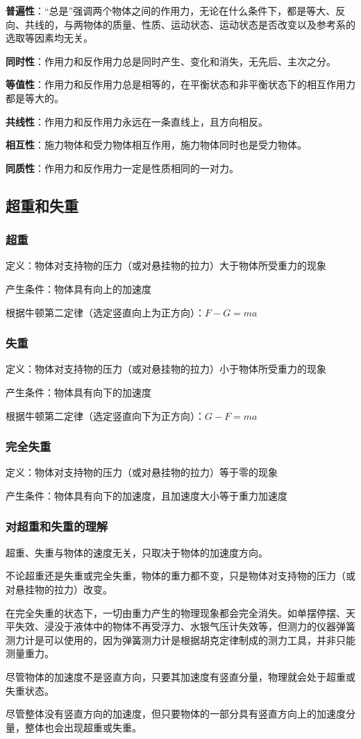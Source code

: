 \textbf{普遍性}：“总是”强调两个物体之间的作用力，无论在什么条件下，都是等大、反向、共线的，与两物体的质量、性质、运动状态、运动状态是否改变以及参考系的选取等因素均无关。

\textbf{同时性}：作用力和反作用力总是同时产生、变化和消失，无先后、主次之分。

\textbf{等值性}：作用力和反作用力总是相等的，在平衡状态和非平衡状态下的相互作用力都是等大的。

\textbf{共线性}：作用力和反作用力永远在一条直线上，且方向相反。

\textbf{相互性}：施力物体和受力物体相互作用，施力物体同时也是受力物体。

\textbf{同质性}：作用力和反作用力一定是性质相同的一对力。

\subsection{超重和失重}

\subsubsection{超重}

定义：物体对支持物的压力（或对悬挂物的拉力）大于物体所受重力的现象

产生条件：物体具有向上的加速度

根据牛顿第二定律（选定竖直向上为正方向）：$F-G=ma$

\subsubsection{失重}

定义：物体对支持物的压力（或对悬挂物的拉力）小于物体所受重力的现象

产生条件：物体具有向下的加速度

根据牛顿第二定律（选定竖直向下为正方向）：$G-F=ma$

\subsubsection{完全失重}

定义：物体对支持物的压力（或对悬挂物的拉力）等于零的现象

产生条件：物体具有向下的加速度，且加速度大小等于重力加速度

\subsubsection{对超重和失重的理解}

超重、失重与物体的速度无关，只取决于物体的加速度方向。

不论超重还是失重或完全失重，物体的重力都不变，只是物体对支持物的压力（或对悬挂物的拉力）改变。

在完全失重的状态下，一切由重力产生的物理现象都会完全消失。如单摆停摆、天平失效、浸没于液体中的物体不再受浮力、水银气压计失效等，但测力的仪器弹簧测力计是可以使用的，因为弹簧测力计是根据胡克定律制成的测力工具，并非只能测量重力。

尽管物体的加速度不是竖直方向，只要其加速度有竖直分量，物理就会处于超重或失重状态。

尽管整体没有竖直方向的加速度，但只要物体的一部分具有竖直方向上的加速度分量，整体也会出现超重或失重。
